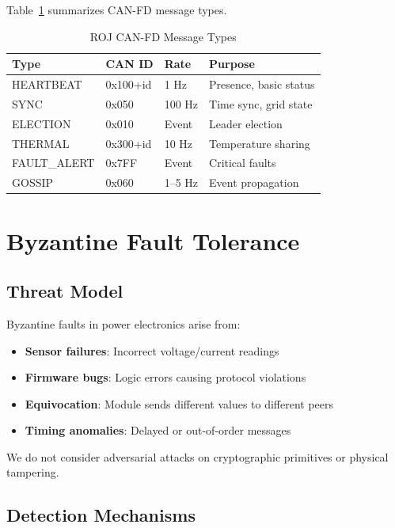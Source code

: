 \documentclass[conference,10pt]{IEEEtran}
\begin{document}
Table~\ref{tab:messages} summarizes CAN-FD message types.

\begin{table}[htbp]
\caption{ROJ CAN-FD Message Types}
\label{tab:messages}
\centering
\begin{tabular}{@{}llll@{}}
\toprule
\textbf{Type} & \textbf{CAN ID} & \textbf{Rate} & \textbf{Purpose} \\
\midrule
HEARTBEAT & 0x100+id & 1 Hz & Presence, basic status \\
SYNC & 0x050 & 100 Hz & Time sync, grid state \\
ELECTION & 0x010 & Event & Leader election \\
THERMAL & 0x300+id & 10 Hz & Temperature sharing \\
FAULT\_ALERT & 0x7FF & Event & Critical faults \\
GOSSIP & 0x060 & 1--5 Hz & Event propagation \\
\bottomrule
\end{tabular}
\end{table}

\section{Byzantine Fault Tolerance}
\label{sec:byzantine}

\subsection{Threat Model}

Byzantine faults in power electronics arise from:
\begin{itemize}
    \item \textbf{Sensor failures}: Incorrect voltage/current readings
    \item \textbf{Firmware bugs}: Logic errors causing protocol violations
    \item \textbf{Equivocation}: Module sends different values to different peers
    \item \textbf{Timing anomalies}: Delayed or out-of-order messages
\end{itemize}

We do not consider adversarial attacks on cryptographic primitives or physical tampering.

\subsection{Detection Mechanisms}
\end{document}
